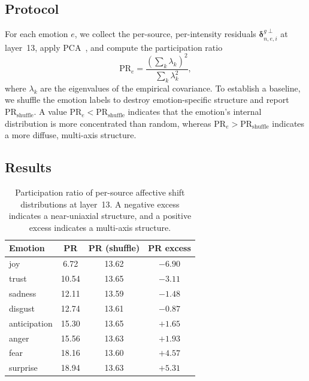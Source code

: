 \subsection*{Protocol}

For each emotion $e$, we collect the per-source, per-intensity residuals $\boldsymbol{\delta}^{g\perp}_{n,e,i}$ at layer~13, apply PCA~\cite{pearson1901pca}, and compute the participation ratio
\[
\mathrm{PR}_e
=\frac{\left(\sum_k \lambda_k\right)^2}{\sum_k \lambda_k^2},
\]
where $\lambda_k$ are the eigenvalues of the empirical covariance.
To establish a baseline, we shuffle the emotion labels to destroy emotion-specific structure and report $\mathrm{PR}_{\mathrm{shuffle}}$. A value $\mathrm{PR}_e < \mathrm{PR}_{\mathrm{shuffle}}$ indicates that the emotion's internal distribution is more concentrated than random, whereas $\mathrm{PR}_e > \mathrm{PR}_{\mathrm{shuffle}}$ indicates a more diffuse, multi-axis structure.\par

\subsection*{Results}

\begin{table}[H]
\centering
\small
\begin{tabular}{lccc}
\toprule
\textbf{Emotion} & \textbf{PR} & \textbf{PR (shuffle)} & \textbf{PR excess} \\
\midrule
joy        &  6.72 & 13.62 & $-6.90$ \\
trust      & 10.54 & 13.65 & $-3.11$ \\
sadness    & 12.11 & 13.59 & $-1.48$ \\
disgust    & 12.74 & 13.61 & $-0.87$ \\
anticipation & 15.30 & 13.65 & $+1.65$ \\
anger      & 15.56 & 13.63 & $+1.93$ \\
fear       & 18.16 & 13.60 & $+4.57$ \\
surprise   & 18.94 & 13.63 & $+5.31$ \\
\bottomrule
\end{tabular}
\caption{Participation ratio of per-source affective shift distributions at layer~13. A negative excess indicates a near-uniaxial structure, and a positive excess indicates a multi-axis structure.}
\label{tab:exp2_participation_ratio}
\end{table}

